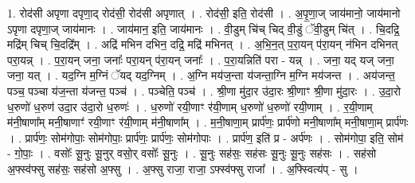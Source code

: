 \documentclass[17pt]{extarticle}
\begin{document}
1. रोद॑सी अपृणा दपृणा॒द् रोद॑सी॒ रोद॑सी अपृणात् । . रोद॑सी॒ इति॒ रोद॑सी । . अ॒पृ॒णा॒ज् जाय॑मानो॒ जाय॑मानो ऽपृणा दपृणा॒ज् जाय॑मानः । . जाय॑मान॒ इति॒ जाय॑मानः । . वी॒डुम् चि॑च् चिद् वी॒डुं ॅवी॒डुम् चि॑त् । . चि॒दद्रि॒ मद्रि॑म् चिच् चि॒दद्रि᳚म् । . अद्रि॑ मभिन दभिन॒ दद्रि॒ मद्रि॑ मभिनत् । . अ॒भि॒न॒त् प॒रा॒यन् प॑रा॒यन् न॑भिन दभिनत् परा॒यन्न् । . प॒रा॒यन् जना॒ जनाः᳚ परा॒यन् प॑रा॒यन् जनाः᳚ । . प॒रा॒यन्निति॑ परा - यन्न् । . जना॒ यद् यज् जना॒ जना॒ यत् । . यद॒ग्नि म॒ग्निं ॅयद् यद॒ग्निम् । . अ॒ग्नि मय॑ज॒न्ता य॑जन्ता॒ग्नि म॒ग्नि मय॑जन्त । . अय॑जन्त॒ पञ्च॒ पञ्चा य॑ज॒न्ता य॑जन्त॒ पञ्च॑ । . पञ्चेति॒ पञ्च॑ । . श्री॒णा मु॑दा॒र उ॑दा॒रः श्री॒णाꣳ श्री॒णा मु॑दा॒रः । . उ॒दा॒रो ध॒रुणो॑ ध॒रुण॑ उदा॒र उ॑दा॒रो ध॒रुणः॑ । . ध॒रुणो॑ रयी॒णाꣳ र॑यी॒णाम् ध॒रुणो॑ ध॒रुणो॑ रयी॒णाम् । . र॒यी॒णाम् म॑नी॒षाणा᳚म् मनी॒षाणाꣳ॑ रयी॒णाꣳ र॑यी॒णाम् म॑नी॒षाणा᳚म् । . म॒नी॒षाणा॒म् प्रार्प॑णः॒ प्रार्प॑णो मनी॒षाणा᳚म् मनी॒षाणा॒म् प्रार्प॑णः । . प्रार्प॑णः॒ सोम॑गोपाः॒ सोम॑गोपाः॒ प्रार्प॑णः॒ प्रार्प॑णः॒ सोम॑गोपाः । . प्रार्प॑ण॒ इति॑ प्र - अर्प॑णः । . सोम॑गोपा॒ इति॒ सोम॑ - गो॒पाः॒ । . वसोः᳚ सू॒नुः सू॒नुर् वसो॒र् वसोः᳚ सू॒नुः । . सू॒नुः सह॑सः॒ सह॑सः सू॒नुः सू॒नुः सह॑सः । . सह॑सो अ॒फ्स्व॑फ्सु सह॑सः॒ सह॑सो अ॒फ्सु । . अ॒फ्सु राजा॒ राजा॒ ऽफ्स्व॑फ्सु राजा᳚ । . अ॒फ्स्वित्य॑प् - सु । \newline
\end{document}

